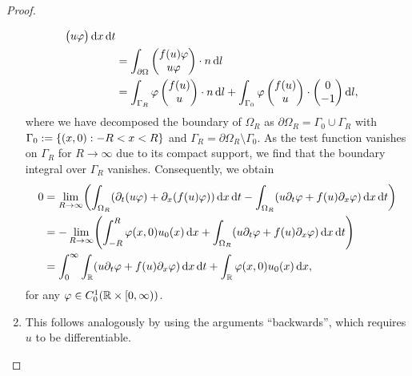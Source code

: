 \begin{proof}
\begin{enumerate}
\begin{align*}
\begin{pmatrix}
				u\varphi
			\end{pmatrix}\d x\d t\\
			&= \int_{\partial\Omega}\begin{pmatrix}
				f\parentheses*{u}\varphi\\
				u\varphi
			\end{pmatrix} \cdot n\d l\\
			&= \int_{\Gamma_R}\varphi\begin{pmatrix}
				f\parentheses*{u}\\
				u
			\end{pmatrix} \cdot n\d l + \int_{\Gamma_0}\varphi\begin{pmatrix}
				f\parentheses*{u}\\
				u
			\end{pmatrix} \cdot \begin{pmatrix}
				0\\
				-1
			\end{pmatrix}\d l,
		\end{align*}
		where we have decomposed the boundary of \(\Omega_R\) as \(\partial\Omega_R = \Gamma_0 \cup \Gamma_R\) with \(\Gamma_0 := \braces*{\parentheses*{x, 0} : -R < x < R}\) and \(\Gamma_R = \partial\Omega_R \setminus \Gamma_0\).
		As the test function vanishes on \(\Gamma_R\) for \(R \to \infty\) due to its compact support, we find that the boundary integral over \(\Gamma_R\) vanishes.
		Consequently, we obtain
		\begin{align*}
			0 &= \lim_{R \to \infty}\parentheses*{\int_{\Omega_R} \parentheses*{\partial_t \parentheses*{u\varphi} + \partial_x\parentheses*{f\parentheses*{u}\varphi}}\d x\d t - \int_{\Omega_R}\parentheses*{u\partial_t \varphi + f\parentheses*{u}\partial_x \varphi}\d x\d t}\\
			&= -\lim_{R \to \infty}\parentheses*{\int_{-R}^R \varphi\parentheses*{x, 0}u_0\parentheses*{x}\d x + \int_{\Omega_R}\parentheses*{u\partial_t \varphi + f\parentheses*{u}\partial_x \varphi}\d x\d t}\\
			&= \int_0^\infty \int_\R \parentheses*{u\partial_t \varphi + f\parentheses*{u}\partial_x \varphi}\d x\d t + \int_\R \varphi\parentheses*{x, 0}u_0\parentheses*{x}\d x,
		\end{align*}
		for any \(\varphi \in C_0^1\parentheses*{\R \times \left[0, \infty\right)}\).
		\item This follows analogously by using the arguments ``backwards'', which requires \(u\) to be differentiable.
	\end{enumerate}
\end{proof}


